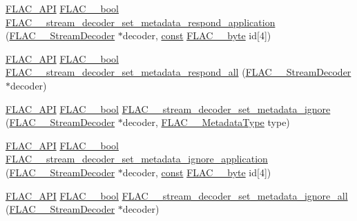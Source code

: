 \begin{DoxyCompactItemize}
\item 
\hyperlink{group__flac__export_ga56ca07df8a23310707732b1c0007d6f5}{F\+L\+A\+C\+\_\+\+A\+PI} \hyperlink{ordinals_8h_a95103469f1cbd78b8cf250194985b34e}{F\+L\+A\+C\+\_\+\+\_\+bool} \hyperlink{group__flac__stream__decoder_gabf2a1e945eb2a158090665e03ff55ad2}{F\+L\+A\+C\+\_\+\+\_\+stream\+\_\+decoder\+\_\+set\+\_\+metadata\+\_\+respond\+\_\+application} (\hyperlink{struct_f_l_a_c_____stream_decoder}{F\+L\+A\+C\+\_\+\+\_\+\+Stream\+Decoder} $\ast$decoder, \hyperlink{getopt1_8c_a2c212835823e3c54a8ab6d95c652660e}{const} \hyperlink{ordinals_8h_a5eb569b12d5b047cdacada4d57924ee3}{F\+L\+A\+C\+\_\+\+\_\+byte} id\mbox{[}4\mbox{]})
\item 
\hyperlink{group__flac__export_ga56ca07df8a23310707732b1c0007d6f5}{F\+L\+A\+C\+\_\+\+A\+PI} \hyperlink{ordinals_8h_a95103469f1cbd78b8cf250194985b34e}{F\+L\+A\+C\+\_\+\+\_\+bool} \hyperlink{group__flac__stream__decoder_gaf3bec52172d727a4db8209b82db00c84}{F\+L\+A\+C\+\_\+\+\_\+stream\+\_\+decoder\+\_\+set\+\_\+metadata\+\_\+respond\+\_\+all} (\hyperlink{struct_f_l_a_c_____stream_decoder}{F\+L\+A\+C\+\_\+\+\_\+\+Stream\+Decoder} $\ast$decoder)
\item 
\hyperlink{group__flac__export_ga56ca07df8a23310707732b1c0007d6f5}{F\+L\+A\+C\+\_\+\+A\+PI} \hyperlink{ordinals_8h_a95103469f1cbd78b8cf250194985b34e}{F\+L\+A\+C\+\_\+\+\_\+bool} \hyperlink{group__flac__stream__decoder_ga0fb395d7c18c136d5a84869f6f2d736f}{F\+L\+A\+C\+\_\+\+\_\+stream\+\_\+decoder\+\_\+set\+\_\+metadata\+\_\+ignore} (\hyperlink{struct_f_l_a_c_____stream_decoder}{F\+L\+A\+C\+\_\+\+\_\+\+Stream\+Decoder} $\ast$decoder, \hyperlink{group__flac__format_gac71714ba8ddbbd66d26bb78a427fac01}{F\+L\+A\+C\+\_\+\+\_\+\+Metadata\+Type} type)
\item 
\hyperlink{group__flac__export_ga56ca07df8a23310707732b1c0007d6f5}{F\+L\+A\+C\+\_\+\+A\+PI} \hyperlink{ordinals_8h_a95103469f1cbd78b8cf250194985b34e}{F\+L\+A\+C\+\_\+\+\_\+bool} \hyperlink{group__flac__stream__decoder_gac5eb8b3cb8df3afe788046317fbe9fb6}{F\+L\+A\+C\+\_\+\+\_\+stream\+\_\+decoder\+\_\+set\+\_\+metadata\+\_\+ignore\+\_\+application} (\hyperlink{struct_f_l_a_c_____stream_decoder}{F\+L\+A\+C\+\_\+\+\_\+\+Stream\+Decoder} $\ast$decoder, \hyperlink{getopt1_8c_a2c212835823e3c54a8ab6d95c652660e}{const} \hyperlink{ordinals_8h_a5eb569b12d5b047cdacada4d57924ee3}{F\+L\+A\+C\+\_\+\+\_\+byte} id\mbox{[}4\mbox{]})
\item 
\hyperlink{group__flac__export_ga56ca07df8a23310707732b1c0007d6f5}{F\+L\+A\+C\+\_\+\+A\+PI} \hyperlink{ordinals_8h_a95103469f1cbd78b8cf250194985b34e}{F\+L\+A\+C\+\_\+\+\_\+bool} \hyperlink{group__flac__stream__decoder_ga6e515420f5b2a5422cd333b3d4c21064}{F\+L\+A\+C\+\_\+\+\_\+stream\+\_\+decoder\+\_\+set\+\_\+metadata\+\_\+ignore\+\_\+all} (\hyperlink{struct_f_l_a_c_____stream_decoder}{F\+L\+A\+C\+\_\+\+\_\+\+Stream\+Decoder} $\ast$decoder)

\end{DoxyCompactItemize}
